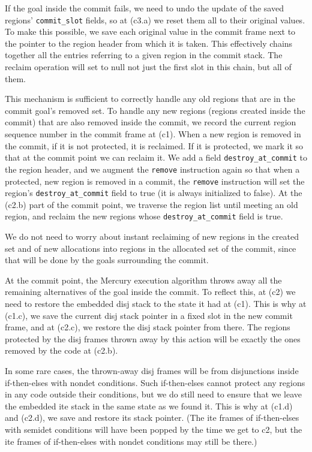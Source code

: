 \documentclass{tlp}
\newcommand{\code}[1]{{\tt#1}}
\begin{document}
If the goal inside the commit fails, we need to undo
the update of the saved regions' \code{commit\_slot} fields,
so at (c3.a) we reset them all to their original values.
To make this possible, we save each original value in the commit frame
next to the pointer to the region header from which it is taken.
This effectively chains together
all the entries referring to a given region in the commit stack.
The reclaim operation will set to null not just the first slot in this chain,
but all of them.

This mechanism is sufficient to correctly handle
any old regions that are in the commit goal's removed set.
To handle any new regions (regions created inside the commit)
that are also removed inside the commit,
we record the current region sequence number in the commit frame at (c1).
When a new region is removed in the commit,
if it is not protected, it is reclaimed.
If it is protected, we mark it so that at the commit point we can reclaim it.
We add a field \code{destroy\_at\_commit} to the region header,
and we augment the \code{remove} instruction again so that
when a protected, new region is removed in a commit,
the \code{remove} instruction
will set the region's \code{destroy\_at\_commit} field to true
(it is always initialized to false).
At the (c2.b) part of the commit point,
we traverse the region list until meeting an old region,
and reclaim the new regions whose \code{destroy\_at\_commit} field is true.

We do not need to worry about instant reclaiming
of new regions in the created set
and of new allocations into regions in the allocated set of the commit,
since that will be done by the goals surrounding the commit.

At the commit point, the Mercury execution algorithm
throws away all the remaining alternatives of the goal inside the commit.
To reflect this, at (c2) we need to restore the embedded disj stack
to the state it had at (c1).
This is why at (c1.c),
we save the current disj stack pointer in a fixed slot in the new commit frame,
and at (c2.c), we restore the disj stack pointer from there.
The regions protected by the disj frames thrown away by this action
will be exactly the ones removed by the code at (c2.b).

In some rare cases, the thrown-away disj frames
will be from disjunctions inside if-then-elses with nondet conditions.
Such if-then-elses cannot protect any regions
in any code outside their conditions,
but we do still need to ensure that
we leave the embedded ite stack in the same state as we found it.
This is why at (c1.d) and (c2.d), we save and restore its stack pointer.
(The ite frames of if-then-elses with semidet conditions
will have been popped by the time we get to c2,
but the ite frames of if-then-elses with nondet conditions may still be there.)
\end{document}
